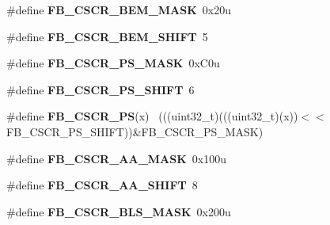 \begin{DoxyCompactItemize}
\item 
\hypertarget{group___f_b___register___masks_gaef7f70f7c6d39c8e1de2a16ccb4b3ccb}{}\#define {\bfseries F\+B\+\_\+\+C\+S\+C\+R\+\_\+\+B\+E\+M\+\_\+\+M\+A\+S\+K}~0x20u\label{group___f_b___register___masks_gaef7f70f7c6d39c8e1de2a16ccb4b3ccb}

\item 
\hypertarget{group___f_b___register___masks_ga2dd3f47a9401af7ae8838b7dc7c379f8}{}\#define {\bfseries F\+B\+\_\+\+C\+S\+C\+R\+\_\+\+B\+E\+M\+\_\+\+S\+H\+I\+F\+T}~5\label{group___f_b___register___masks_ga2dd3f47a9401af7ae8838b7dc7c379f8}

\item 
\hypertarget{group___f_b___register___masks_ga07623c4ea4b4dfdc64c7dc0431719350}{}\#define {\bfseries F\+B\+\_\+\+C\+S\+C\+R\+\_\+\+P\+S\+\_\+\+M\+A\+S\+K}~0x\+C0u\label{group___f_b___register___masks_ga07623c4ea4b4dfdc64c7dc0431719350}

\item 
\hypertarget{group___f_b___register___masks_ga2cd33266c104fc645dcadaea7e659aa8}{}\#define {\bfseries F\+B\+\_\+\+C\+S\+C\+R\+\_\+\+P\+S\+\_\+\+S\+H\+I\+F\+T}~6\label{group___f_b___register___masks_ga2cd33266c104fc645dcadaea7e659aa8}

\item 
\hypertarget{group___f_b___register___masks_ga6056baabcdce2969870d89284a4e043f}{}\#define {\bfseries F\+B\+\_\+\+C\+S\+C\+R\+\_\+\+P\+S}(x)                                                    ~(((uint32\+\_\+t)(((uint32\+\_\+t)(x))$<$$<$F\+B\+\_\+\+C\+S\+C\+R\+\_\+\+P\+S\+\_\+\+S\+H\+I\+F\+T))\&F\+B\+\_\+\+C\+S\+C\+R\+\_\+\+P\+S\+\_\+\+M\+A\+S\+K)\label{group___f_b___register___masks_ga6056baabcdce2969870d89284a4e043f}

\item 
\hypertarget{group___f_b___register___masks_gae26d2b6451432c0000d30a23e541020f}{}\#define {\bfseries F\+B\+\_\+\+C\+S\+C\+R\+\_\+\+A\+A\+\_\+\+M\+A\+S\+K}~0x100u\label{group___f_b___register___masks_gae26d2b6451432c0000d30a23e541020f}

\item 
\hypertarget{group___f_b___register___masks_gaf3d9d750b7dddf0d1df65c98d7ecc7e1}{}\#define {\bfseries F\+B\+\_\+\+C\+S\+C\+R\+\_\+\+A\+A\+\_\+\+S\+H\+I\+F\+T}~8\label{group___f_b___register___masks_gaf3d9d750b7dddf0d1df65c98d7ecc7e1}

\item 
\hypertarget{group___f_b___register___masks_gac8f4e3d4dba2c5e902c51e82cd870d9f}{}\#define {\bfseries F\+B\+\_\+\+C\+S\+C\+R\+\_\+\+B\+L\+S\+\_\+\+M\+A\+S\+K}~0x200u\label{group___f_b___register___masks_gac8f4e3d4dba2c5e902c51e82cd870d9f}


\end{DoxyCompactItemize}
